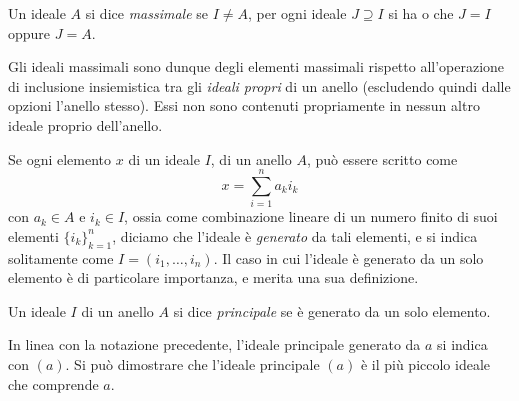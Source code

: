 \begin{definizione} \label{d:ideale-massimale}
	Un ideale $A$ si dice \emph{massimale} se $I\neq A$, per ogni ideale $J\supseteq I$ si ha o che $J=I$ oppure $J=A$.
\end{definizione}
Gli ideali massimali sono dunque degli elementi massimali rispetto all'operazione di inclusione insiemistica tra gli \emph{ideali propri} di un anello (escludendo quindi dalle opzioni l'anello stesso).
Essi non sono contenuti propriamente in nessun altro ideale proprio dell'anello.

Se ogni elemento $x$ di un ideale $I$, di un anello $A$, può essere scritto come
\begin{equation*}
	x=\sum_{i=1}^na_ki_k
\end{equation*}
con $a_k\in A$ e $i_k\in I$, ossia come combinazione lineare di un numero finito di suoi elementi $\{i_k\}_{k=1}^n$, diciamo che l'ideale è \emph{generato} da tali elementi, e si indica solitamente come $I=(i_1,\dots,i_n)$.
Il caso in cui l'ideale è generato da un solo elemento è di particolare importanza, e merita una sua definizione.
\begin{definizione} \label{d:ideale-principale}
	Un ideale $I$ di un anello $A$ si dice \emph{principale} se è generato da un solo elemento.
\end{definizione}
In linea con la notazione precedente, l'ideale principale generato da $a$ si indica con $(a)$.
Si può dimostrare che l'ideale principale $(a)$ è il più piccolo ideale che comprende $a$.

